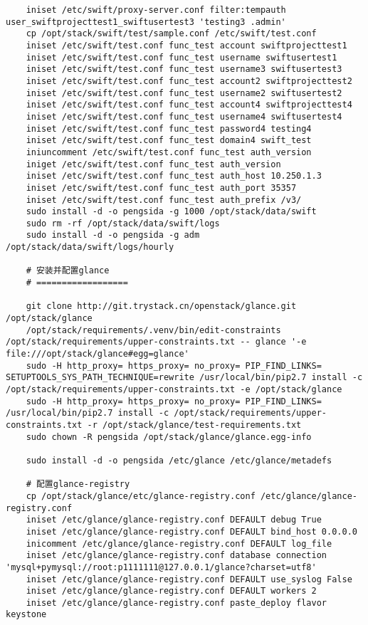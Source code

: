 \documentclass[a4paper,left=1.5cm,right=1.5cm,11pt]{article}
\begin{document}
\begin{lstlisting}
    iniset /etc/swift/proxy-server.conf filter:tempauth user_swiftprojecttest1_swiftusertest3 'testing3 .admin'
	cp /opt/stack/swift/test/sample.conf /etc/swift/test.conf
    iniset /etc/swift/test.conf func_test account swiftprojecttest1
    iniset /etc/swift/test.conf func_test username swiftusertest1
    iniset /etc/swift/test.conf func_test username3 swiftusertest3
    iniset /etc/swift/test.conf func_test account2 swiftprojecttest2
    iniset /etc/swift/test.conf func_test username2 swiftusertest2
    iniset /etc/swift/test.conf func_test account4 swiftprojecttest4
    iniset /etc/swift/test.conf func_test username4 swiftusertest4
    iniset /etc/swift/test.conf func_test password4 testing4
    iniset /etc/swift/test.conf func_test domain4 swift_test
	iniuncomment /etc/swift/test.conf func_test auth_version
	iniget /etc/swift/test.conf func_test auth_version
	iniset /etc/swift/test.conf func_test auth_host 10.250.1.3
    iniset /etc/swift/test.conf func_test auth_port 35357
    iniset /etc/swift/test.conf func_test auth_prefix /v3/
	sudo install -d -o pengsida -g 1000 /opt/stack/data/swift
	sudo rm -rf /opt/stack/data/swift/logs
	sudo install -d -o pengsida -g adm /opt/stack/data/swift/logs/hourly

	# 安装并配置glance
	# ==================

	git clone http://git.trystack.cn/openstack/glance.git /opt/stack/glance
	/opt/stack/requirements/.venv/bin/edit-constraints /opt/stack/requirements/upper-constraints.txt -- glance '-e file:///opt/stack/glance#egg=glance'
	sudo -H http_proxy= https_proxy= no_proxy= PIP_FIND_LINKS= SETUPTOOLS_SYS_PATH_TECHNIQUE=rewrite /usr/local/bin/pip2.7 install -c /opt/stack/requirements/upper-constraints.txt -e /opt/stack/glance
	sudo -H http_proxy= https_proxy= no_proxy= PIP_FIND_LINKS= /usr/local/bin/pip2.7 install -c /opt/stack/requirements/upper-constraints.txt -r /opt/stack/glance/test-requirements.txt
	sudo chown -R pengsida /opt/stack/glance/glance.egg-info

	sudo install -d -o pengsida /etc/glance /etc/glance/metadefs

	# 配置glance-registry
    cp /opt/stack/glance/etc/glance-registry.conf /etc/glance/glance-registry.conf
    iniset /etc/glance/glance-registry.conf DEFAULT debug True
    iniset /etc/glance/glance-registry.conf DEFAULT bind_host 0.0.0.0
    inicomment /etc/glance/glance-registry.conf DEFAULT log_file
	iniset /etc/glance/glance-registry.conf database connection 'mysql+pymysql://root:p1111111@127.0.0.1/glance?charset=utf8'
    iniset /etc/glance/glance-registry.conf DEFAULT use_syslog False
    iniset /etc/glance/glance-registry.conf DEFAULT workers 2
    iniset /etc/glance/glance-registry.conf paste_deploy flavor keystone
	

\end{lstlisting}
\end{document}
